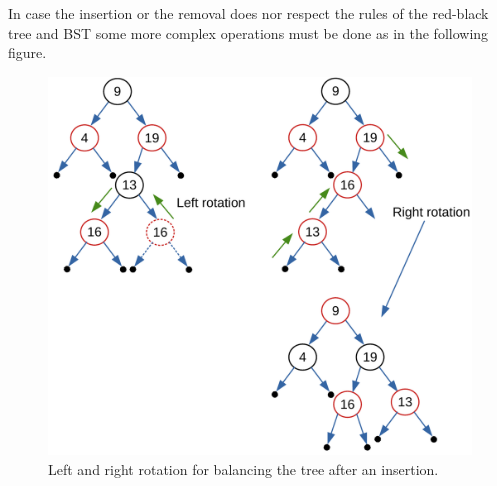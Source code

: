 In case the insertion or the removal does nor respect the rules of the red-black tree and BST some more complex operations must be done as in the following figure.

\begin{figure}[H]
	\begin{center}
		\includegraphics[scale=.6]{chapters/trees/images/trees_22.pdf}
		\caption[Left and right rotation for balancing the tree after an insertion.]{Left and right rotation for balancing the tree after an insertion.}
		\label{trees_22}
	\end{center}
\end{figure}

